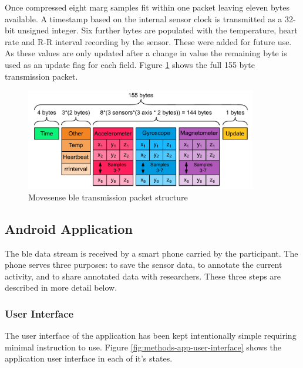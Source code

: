 Once compressed eight \acrshort{marg} samples fit within one packet leaving eleven bytes available. A timestamp based on the internal sensor clock is transmitted as a 32-bit unsigned integer. Six further bytes are populated with the temperature, heart rate and R-R interval recording by the sensor. These were added for future use. As these values are only updated after a change in value the remaining byte is used as an update flag for each field. Figure \ref{fig:methods-ble-packet-structure} shows the full 155 byte transmission packet.

\begin{figure}[hbt]
    \centering
    \includegraphics[width=0.9\textwidth]{content/3-Methods/BLE_Bytes_Packets.pdf}
    \caption[Movesense  transmission packet structure]{Movesense \acrlong{ble} transmission packet structure}    \label{fig:methods-ble-packet-structure}
\end{figure}


\subsection{Android Application}
The \acrshort{ble} data stream is received by a smart phone carried by the participant. The phone serves three purposes: to save the sensor data, to annotate the current activity, and to share annotated data with researchers. These three steps are described in more detail below. 

\subsubsection{User Interface}
The user interface of the application has been kept intentionally simple requiring minimal instruction to use. Figure \ref{fig:methods-app-user-interface} shows the application user interface in each of it's states.

